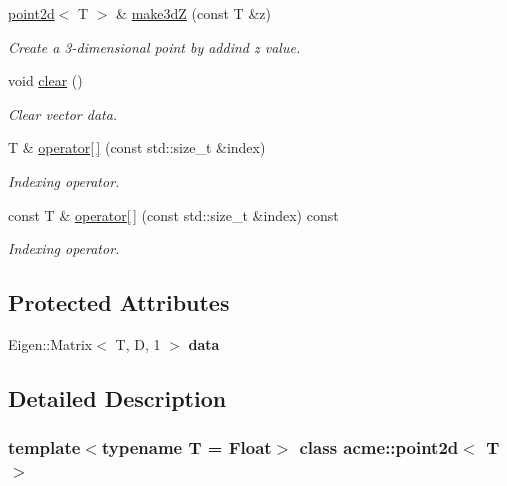 \begin{DoxyCompactItemize}
\hyperlink{classacme_1_1point2d}{point2d}$<$ T $>$ \& \hyperlink{classacme_1_1point2d_a605f4d335747c08026316ec4982b7eb5}{make3dZ} (const T \&z)
\begin{DoxyCompactList}\small\item\em Create a 3-\/dimensional point by addind z value. \end{DoxyCompactList}\item 
\mbox{\label{classacme_1_1pointnd_a2d0b84e609dc1ad5cbbe631c5bb5791f}} 
void \hyperlink{classacme_1_1pointnd_a2d0b84e609dc1ad5cbbe631c5bb5791f}{clear} ()
\begin{DoxyCompactList}\small\item\em Clear vector data. \end{DoxyCompactList}\item 
T \& \hyperlink{classacme_1_1pointnd_a35b0691673728d98d455c007612d6b91}{operator\mbox{[}$\,$\mbox{]}} (const std\+::size\+\_\+t \&index)
\begin{DoxyCompactList}\small\item\em Indexing operator. \end{DoxyCompactList}\item 
const T \& \hyperlink{classacme_1_1pointnd_a565e9ed195c8f8dadc570a029a3deb94}{operator\mbox{[}$\,$\mbox{]}} (const std\+::size\+\_\+t \&index) const
\begin{DoxyCompactList}\small\item\em Indexing operator. \end{DoxyCompactList}\end{DoxyCompactItemize}
\subsection*{Protected Attributes}
\begin{DoxyCompactItemize}
\item 
\mbox{\label{classacme_1_1pointnd_a13b19080ed617e2a9c5d6058f07d4f4b}} 
Eigen\+::\+Matrix$<$ T, D, 1 $>$ {\bfseries data}
\end{DoxyCompactItemize}


\subsection{Detailed Description}
\subsubsection*{template$<$typename T = Float$>$\newline
class acme\+::point2d$<$ T $>$}

